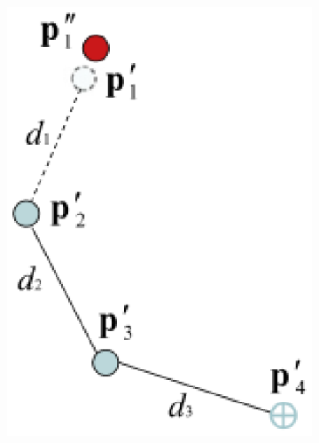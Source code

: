 \begin{figure}
\begin{subfigure}{0.2\textwidth}
        \includegraphics[width=\linewidth]{grafika/fabrik_iteration5.eps}
        \subcaption{}
        \label{fig:fabrik5}
    \end{subfigure}
    \begin{subfigure}{0.2\textwidth}
        \centering

\end{subfigure}
\end{figure}
